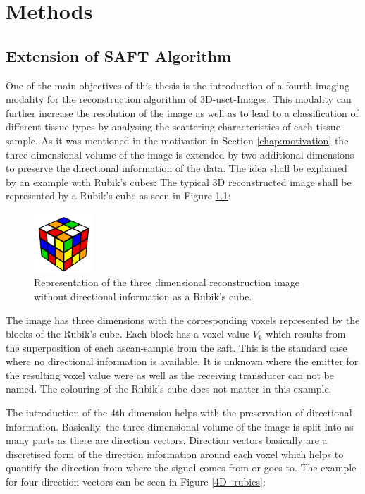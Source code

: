 \chapter{Methods}
\label{chap:methods}

\section{Extension of SAFT Algorithm}
\label{chap:SAFT_Augment}
One of the main objectives of this thesis is the introduction of a fourth imaging modality for the reconstruction algorithm of 3D-\ac{usct}-Images. This modality can further increase the resolution of the image as well as to lead to a classification of different tissue types by analysing the scattering characteristics of each tissue sample. As it was mentioned in the motivation in Section \ref{chap:motivation} the three dimensional volume of the image is extended by two additional dimensions to preserve the directional information of the data. The idea shall be explained by an example with Rubik's cubes:
The typical 3D reconstructed image shall be represented by a Rubik's cube as seen in Figure \ref{3D_rubics}:
\begin{figure}[H]
    \centering
    \includegraphics[width=0.2\textwidth]{Graphics/rubicscube.png}
    \caption{Representation of the three dimensional reconstruction image without directional information as a Rubik's cube.}
    \label{3D_rubics}
\end{figure}

The image has three dimensions with the corresponding voxels represented by the blocks of the Rubik's cube. Each block has a voxel value $V_k$ which results from the superposition of each \ac{ascan}-sample from the \ac{saft}. This is the standard case where no directional information is available. It is unknown where the emitter for the resulting voxel value were as well as the receiving transducer can not be named. The colouring of the Rubik's cube does not matter in this example.

The introduction of the 4th dimension helps with the preservation of directional information. Basically, the three dimensional volume of the image is split into as many parts as there are direction vectors. Direction vectors basically are a discretised form of the direction information around each voxel which helps to quantify the direction from where the signal comes from or goes to. The example for four direction vectors can be seen in Figure \ref{4D_rubics}:

